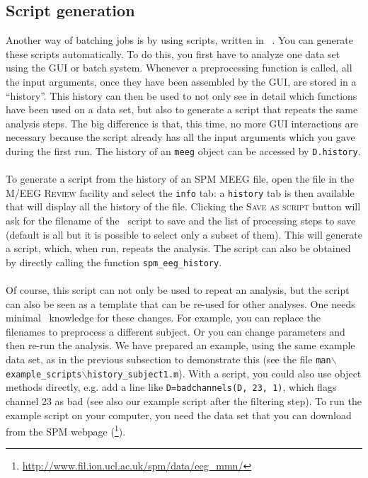 \subsection{Script generation}
Another way of batching jobs is by using scripts, written in \matlab\ . You can generate these scripts automatically. To do this, you first have to analyze one data set using the GUI or batch system. Whenever a preprocessing function is called, all the input arguments, once they have been assembled by the GUI, are stored in a ``history''. This history can then be used to not only see in detail which functions have been used on a data set, but also to generate a script that repeats the same analysis steps. The big difference is that, this time, no more GUI interactions are necessary because the script already has all the input arguments which you gave during the first run. The history of an \texttt{meeg} object can be accessed by \texttt{D.history}. 
\\
\\
To generate a script from the history of an SPM MEEG file, open the file in the M/EEG \textsc{Review} facility and select the \texttt{info} tab: a \texttt{history} tab is then available that will display all the history of the file. Clicking the \textsc{Save as script} button will ask for the filename of the \matlab\ script to save and the list of processing steps to save (default is all but it is possible to select only a subset of them). This will generate a script, which, when run, repeats the analysis. The script can also be obtained by directly calling the function \texttt{spm\_eeg\_history}.
\\
\\
Of course, this script can not only be used to repeat an analysis, but the script can also be seen as a template that can be re-used for other analyses. One needs minimal \matlab\ knowledge for these changes. For example, you can replace the filenames to preprocess a different subject. Or you can change parameters and then re-run the analysis. We have prepared an example, using the same example data set, as in the previous subsection to demonstrate this (see the file \texttt{man$\backslash$example\_scripts$\backslash$history\_subject1.m}). With a script, you could also use object methods directly, e.g. add a line like \texttt{D=badchannels(D, 23, 1)}, which flags channel 23 as bad (see also our example script after the filtering step). To run the example script on your computer, you need the data set that you can download from the SPM webpage (\footnote{\url{http://www.fil.ion.ucl.ac.uk/spm/data/eeg\_mmn/}}).
